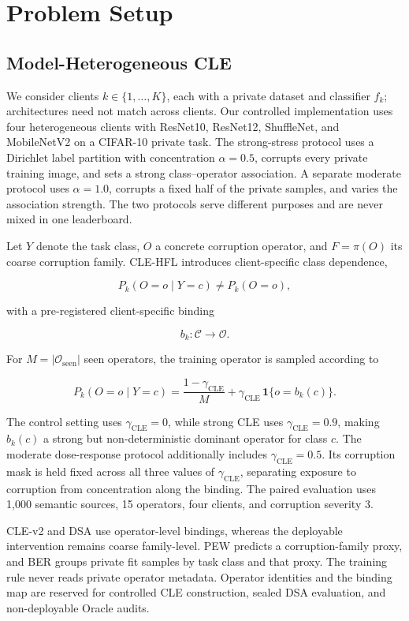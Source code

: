 \section{Problem Setup}

\subsection{Model-Heterogeneous CLE}

We consider clients \(k\in\{1,\ldots,K\}\), each with a private dataset and classifier \(f_k\); architectures need not match across clients. Our controlled implementation uses four heterogeneous clients with ResNet10, ResNet12, ShuffleNet, and MobileNetV2 on a CIFAR-10 private task. The strong-stress protocol uses a Dirichlet label partition with concentration \(\alpha=0.5\), corrupts every private training image, and sets a strong class--operator association. A separate moderate protocol uses \(\alpha=1.0\), corrupts a fixed half of the private samples, and varies the association strength. The two protocols serve different purposes and are never mixed in one leaderboard.

Let \(Y\) denote the task class, \(O\) a concrete corruption operator, and \(F=\pi(O)\) its coarse corruption family. CLE-HFL introduces client-specific class dependence,

\[
P_k(O=o\mid Y=c)\neq P_k(O=o),
\]

with a pre-registered client-specific binding

\[
b_k:\mathcal C\rightarrow\mathcal O.
\]

For \(M=|\mathcal O_{\mathrm{seen}}|\) seen operators, the training operator is sampled according to

\[
P_k(O=o\mid Y=c)
=\frac{1-\gamma_{\mathrm{CLE}}}{M}
+\gamma_{\mathrm{CLE}}\,\mathbf 1\{o=b_k(c)\}.
\]

The control setting uses \(\gamma_{\mathrm{CLE}}=0\), while strong CLE uses \(\gamma_{\mathrm{CLE}}=0.9\), making \(b_k(c)\) a strong but non-deterministic dominant operator for class \(c\). The moderate dose-response protocol additionally includes \(\gamma_{\mathrm{CLE}}=0.5\). Its corruption mask is held fixed across all three values of \(\gamma_{\mathrm{CLE}}\), separating exposure to corruption from concentration along the binding. The paired evaluation uses 1,000 semantic sources, 15 operators, four clients, and corruption severity 3.

CLE-v2 and DSA use operator-level bindings, whereas the deployable intervention remains coarse family-level. PEW predicts a corruption-family proxy, and BER groups private fit samples by task class and that proxy. The training rule never reads private operator metadata. Operator identities and the binding map are reserved for controlled CLE construction, sealed DSA evaluation, and non-deployable Oracle audits.

